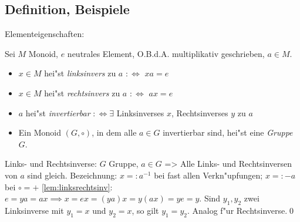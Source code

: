 \subsection{Definition, Beispiele}
 Elementeigenschaften:{
  Sei $M$ Monoid, $e$ neutrales Element, O.B.d.A. multiplikativ geschrieben, $a\in M$.
  \begin{itemize}
  \item $x\in M$ hei"st \emph{linksinvers} zu $a$ $:\iff$ $xa=e$
  \item $x\in M$ hei"st \emph{rechtsinvers} zu $a$ $:\iff$ $ax=e$
  \item $a$ hei"st \emph{invertierbar} $:\iff \exists$ Linksinverses $x$, 
    Rechtsinverses $y$ zu $a$
  \item Ein Monoid $(G,\circ)$, in dem alle $a\in G$ invertierbar sind, hei"st
    eine \emph{Gruppe} $G$.
  \end{itemize}
 }
\lemma Links- und Rechtsinverse:
  $G$ Gruppe, $a\in G$ => {
  \label{lem:linksrechtsinv}
  Alle Links- und Rechtsinversen von $a$ sind gleich.
  Bezeichnung: $x=:a^{-1}$ bei fast allen Verkn"upfungen; $x=:-a$ bei $\circ =+$
  }
\proof \ref{lem:linksrechtsinv}:{
  $e=ya=ax \implies x=ex = (ya)x = y(ax) = ye = y$.
  Sind $y_1, y_2$ zwei Linksinverse  mit $y_1=x$ und $y_2=x$, so gilt
  $y_1=y_2$. Analog f"ur Rechtsinverse.\qed
  }
